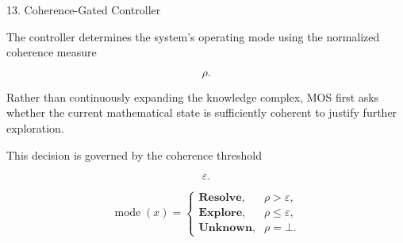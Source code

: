 %
%

\begin{mosbox}{13. Coherence-Gated Controller}

\BodyFont

The controller determines the system's operating mode using the
normalized coherence measure

\[
\rho.
\]

Rather than continuously expanding the knowledge complex, MOS first asks
whether the current mathematical state is sufficiently coherent to
justify further exploration.

This decision is governed by the coherence threshold

\[
\varepsilon.
\]

\end{mosbox}


\begin{eqbox}

\[
\boxed{
\operatorname{mode}(x)=
\begin{cases}
\textbf{Resolve},
&
\rho>\varepsilon,
\\[3mm]
\textbf{Explore},
&
\rho\le\varepsilon,
\\[3mm]
\textbf{Unknown},
&
\rho=\bot.
\end{cases}
}
\]

\end{eqbox}


\begin{center}


\end{center}

